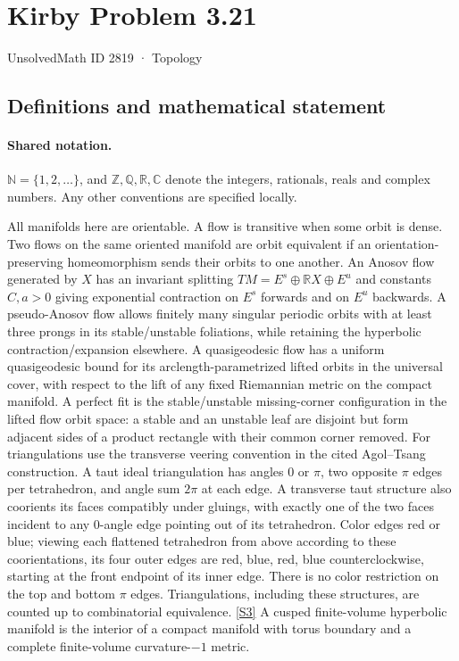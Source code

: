 \documentclass[11pt]{article}
\newcommand{\sref}[2]{\hyperlink{source:#1:#2}{[S#2]}}
\begin{document}
\setcounter{section}{2818}
\section{Kirby Problem 3.21}\label{2819}
{\small\sffamily UnsolvedMath ID 2819 · Topology}
\subsection{Definitions and mathematical statement}

\paragraph{Shared notation.}$\mathbb N=\{1,2,\ldots\}$, and $\mathbb Z,\mathbb Q,\mathbb R,\mathbb C$ denote the integers, rationals, reals and complex numbers. Any other conventions are specified locally.


All manifolds here are orientable. A flow is transitive when some orbit is dense. Two flows on the same oriented manifold are orbit equivalent if an orientation-preserving homeomorphism sends their orbits to one another. An Anosov flow generated by $X$ has an invariant splitting $TM=E^s\oplus\mathbb RX\oplus E^u$ and constants $C,a>0$ giving exponential contraction on $E^s$ forwards and on $E^u$ backwards. A pseudo-Anosov flow allows finitely many singular periodic orbits with at least three prongs in its stable/unstable foliations, while retaining the hyperbolic contraction/expansion elsewhere. A quasigeodesic flow has a uniform quasigeodesic bound for its arclength-parametrized lifted orbits in the universal cover, with respect to the lift of any fixed Riemannian metric on the compact manifold. A perfect fit is the stable/unstable missing-corner configuration in the lifted flow orbit space: a stable and an unstable leaf are disjoint but form adjacent sides of a product rectangle with their common corner removed.
For triangulations use the transverse veering convention in the cited Agol--Tsang construction. A taut ideal triangulation has angles $0$ or $\pi$, two opposite $\pi$ edges per tetrahedron, and angle sum $2\pi$ at each edge. A transverse taut structure also coorients its faces compatibly under gluings, with exactly one of the two faces incident to any $0$-angle edge pointing out of its tetrahedron. Color edges red or blue; viewing each flattened tetrahedron from above according to these coorientations, its four outer edges are red, blue, red, blue counterclockwise, starting at the front endpoint of its inner edge. There is no color restriction on the top and bottom $\pi$ edges. Triangulations, including these structures, are counted up to combinatorial equivalence. \sref{2819}{3} A cusped finite-volume hyperbolic manifold is the interior of a compact manifold with torus boundary and a complete finite-volume curvature-$-1$ metric.
\end{document}
